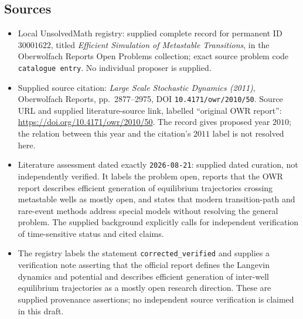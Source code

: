 \documentclass[11pt]{article}
\begin{document}
\subsection{Sources}
\begin{itemize}
\item Local UnsolvedMath registry: supplied complete record for permanent ID \(30001622\), titled \emph{Efficient Simulation of Metastable Transitions}, in the Oberwolfach Reports Open Problems collection; exact source problem code \texttt{catalogue entry}. No individual proposer is supplied.
\item Supplied source citation: \emph{Large Scale Stochastic Dynamics (2011)}, Oberwolfach Reports, pp.~2877--2975, DOI \texttt{10.4171/owr/2010/50}. Source URL and supplied literature-source link, labelled ``original OWR report'': \url{https://doi.org/10.4171/owr/2010/50}. The record gives proposed year \(2010\); the relation between this year and the citation's \(2011\) label is not resolved here.
\item Literature assessment dated exactly \texttt{2026-08-21}: supplied dated curation, not independently verified. It labels the problem open, reports that the OWR report describes efficient generation of equilibrium trajectories crossing metastable wells as mostly open, and states that modern transition-path and rare-event methods address special models without resolving the general problem. The supplied background explicitly calls for independent verification of time-sensitive status and cited claims.
\item The registry labels the statement \texttt{corrected\_verified} and supplies a verification note asserting that the official report defines the Langevin dynamics and potential and describes efficient generation of inter-well equilibrium trajectories as a mostly open research direction. These are supplied provenance assertions; no independent source verification is claimed in this draft.
\end{itemize}
\end{document}
